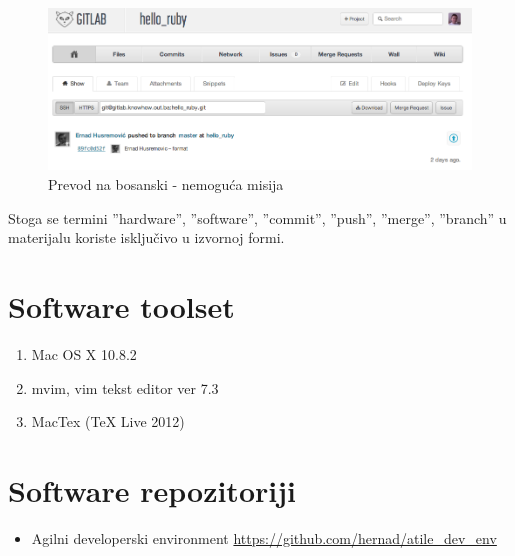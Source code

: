 \documentclass[times, utf8, seminar]{fit}
\begin{document}
\begin{figure}[H]
\centering
\includegraphics[width=16cm]{img/cik_prevedi.png}
\caption{Prevod na bosanski - nemoguća misija}
\end{figure}

Stoga se termini ''hardware'', ''software'', ''commit'', ''push'', ''merge'', ''branch'' u materijalu koriste isključivo u izvornoj formi.

\chapter{Software toolset}
\begin{enumerate}
  \item Mac OS X 10.8.2
  \item mvim, vim tekst editor ver 7.3
  \item MacTex (TeX Live 2012)
\end{enumerate}

\chapter{Software repozitoriji}

\begin{itemize}
  \item Agilni developerski environment  \url{https://github.com/hernad/atile\_dev\_env}

\end{itemize}
\end{document}
